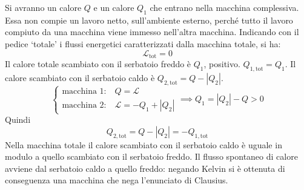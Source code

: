 \documentclass[10pt,a4paper]{book}
\begin{document}
\FloatBarrier
Si avranno un calore $Q$ e un calore $Q_1$ che entrano nella macchina complessiva. Essa non compie un lavoro netto, sull'ambiente esterno, perché tutto il lavoro compiuto da una macchina viene immesso nell'altra macchina. Indicando con il pedice ‘totale' i flussi energetici caratterizzati dalla macchina totale, si ha:
\[
	\mathcal{L}_{\text{tot} } = 0
\]
Il calore totale scambiato con il serbatoio freddo è $Q_1$, positivo. $Q_{1,\text{tot}} = Q_1$. Il calore scambiato con il serbatoio caldo è $Q_{2,\text{tot}} = Q - |Q_2|$.
\[
	\left\{ \begin{array}{l}
	 	\text{macchina 1:}\quad Q = \mathcal{L}   \\
	 	\text{macchina 2:}\quad \mathcal{L} = - Q_1+|Q_2|
	\end{array} \right.
						\implies Q_1 = |Q_2| - Q > 0
\]
Quindi
\[
	Q_{2,\text{tot} } = Q - |Q_2| = - Q_{1,\text{tot}}
\]
Nella macchina totale il calore scambiato con il serbatoio caldo è uguale in modulo a quello scambiato con il serbatoio freddo. Il flusso spontaneo di calore avviene dal serbatoio caldo a quello freddo: negando Kelvin si è ottenuta di conseguenza una macchina che nega l'enunciato di Clausius.
\end{document}
